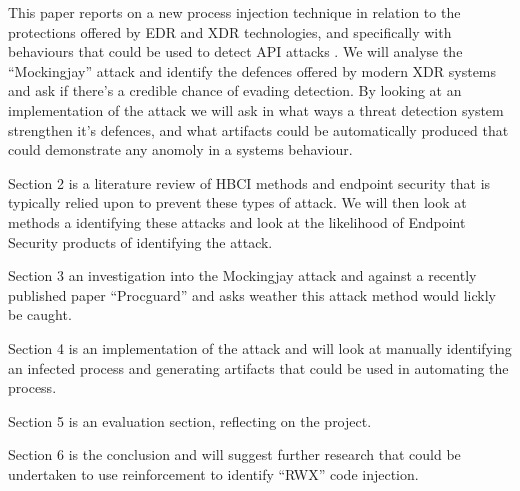 This paper reports on a new process injection technique \autocite{Peixoto:2023} in relation to the protections offered by EDR and XDR technologies, and specifically with behaviours that could be used to detect API attacks \autocite{Wang:2022}.  We will analyse the ``Mockingjay'' attack and identify the defences offered by modern XDR systems and ask if there's a credible chance of evading detection.  By looking at an implementation of the attack we will ask in what ways a threat detection system strengthen it's defences, and what artifacts could be automatically produced that could demonstrate any anomoly in a systems behaviour. 

Section 2 is a literature review of HBCI methods and endpoint security that is typically relied upon to prevent these types of attack.  We will then look at methods a identifying these attacks and look at the likelihood of Endpoint Security products of identifying the attack.

Section 3 an investigation into the Mockingjay attack and against a recently published paper ``Procguard'' \autocite{Wang:2022} and asks weather this attack method would lickly be caught.


Section 4 is an implementation of the attack and will look at manually identifying an infected process and generating artifacts that could be used in automating the process.

Section 5 is an evaluation section, reflecting on the project.

Section 6 is the conclusion and will suggest further research that could be undertaken to use reinforcement to identify ``RWX'' code injection.

